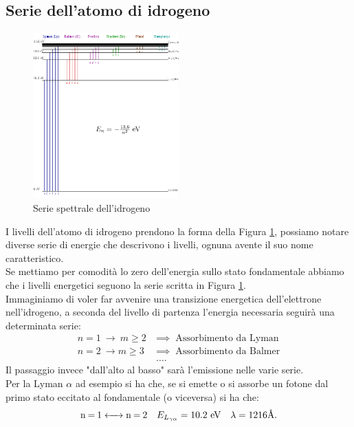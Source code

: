 \subsection{Serie dell'atomo di idrogeno}%
\begin{figure}[H]
	\centering
	\includegraphics[width=0.5\textwidth]{figures/serie_idrogeno.png}
	\caption{\scriptsize Serie spettrale dell'idrogeno}
	\label{fig:-figures-serie_idrogeno-png}
\end{figure}
I livelli dell'atomo di idrogeno prendono la forma della Figura \ref{fig:-figures-serie_idrogeno-png}, possiamo notare diverse serie di energie che descrivono i livelli, ognuna avente il suo nome caratteristico.\\
Se mettiamo per comodità lo zero dell'energia sullo stato fondamentale abbiamo che i livelli energetici seguono la serie scritta in Figura \ref{fig:-figures-serie_idrogeno-png}.\\
Immaginiamo di voler far avvenire una transizione energetica dell'elettrone nell'idrogeno, a seconda del livello di partenza l'energia necessaria seguirà una determinata serie:
\begin{align*}
	n=1 \ \to \ m \ge 2 \ &\implies \ \text{ Assorbimento da Lyman}\\
	n=2 \ \to m\ge 3 \ &\implies \ \text{ Assorbimento da Balmer} \\
			   &\ldots
.\end{align*}
Il passaggio invece "dall'alto al basso" sarà l'emissione nelle varie serie.\\ 
Per la Lyman $\alpha $ ad esempio si ha che, se si emette o si assorbe un fotone dal primo stato eccitato al fondamentale (o viceversa) si ha che:
\begin{align*}
	&\ce{n = 1 <-> n = 2 }  & E_{L_{\gamma \alpha }} = 10.2 \text{ eV}& &\lambda = 1216 \text{\AA}
.\end{align*}
